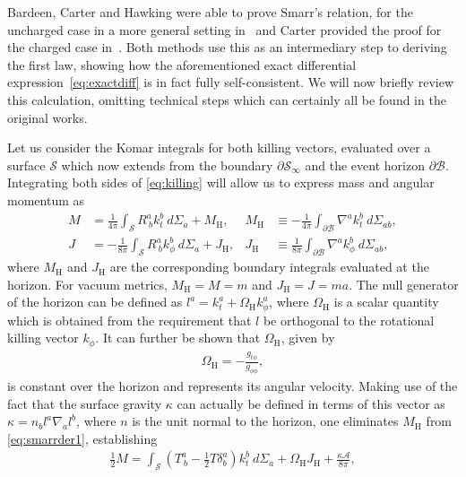 \documentclass[
twoside,
openright,
frontopenright,
]{dmathesis}
\newcommand{\nn}{\nonumber}
\begin{document}
Bardeen, Carter and Hawking were able to prove Smarr's relation, for the
uncharged case in a more general setting in~\cite{Bardeen:1973gs} and Carter
provided the proof for the charged case
in~\cite{Carter:1973rla,Carter2010}. Both methods use this as an intermediary
step to deriving the first law, showing how the aforementioned exact
differential expression~\eqref{eq:exactdiff} is in fact fully
self-consistent. We will now briefly review this calculation, omitting technical
steps which can certainly all be found in the original works.

Let us consider the Komar integrals for both killing vectors, evaluated over a
surface $\mathcal{S}$ which now extends from the boundary
$\partial \mathcal{S}_\infty$ and the event horizon $\partial
\mathcal{B}$. Integrating both sides of \cref{eq:killing} will allow us to
express mass and angular momentum as
\begin{align}
  M &= \frac{1}{4\pi}\int_\mathcal{S} R^a_{~b}k^b_t ~d\Sigma_a + M_\mathrm{H}, 
  &M_\mathrm{H} &\equiv -\frac{1}{4\pi}\int_{\partial \mathcal{B}}\nabla^a k_t^b ~ d\Sigma_{ab},\nn\\
  J &= -\frac{1}{8\pi}\int_\mathcal{S} R^a_{~b}k^b_\phi ~d\Sigma_a + J_\mathrm{H}, 
  &J_\mathrm{H} &\equiv \frac{1}{8\pi}\int_{\partial\mathcal{B}}\nabla^a k_\phi^b ~ d\Sigma_{ab},
\label{eq:smarrder1}
\end{align}
where $M_\mathrm{H}$ and $J_\mathrm{H}$ are the corresponding boundary integrals
evaluated at the horizon. For vacuum metrics, $M_\mathrm{H}=M=m$ and
$J_\mathrm{H}=J=ma$. The null generator of the horizon can be defined as
$l^a = k_t^a + \Omega_\mathrm{H} k_\phi^a$, where $\Omega_\mathrm{H}$ is a
scalar quantity which is obtained from the requirement that $l$ be orthogonal to
the rotational killing vector $k_\phi$. It can further be shown that
$\Omega_\mathrm{H}$, given by
\begin{align}
  \label{eq:angularvelocity}
  \Omega_\mathrm{H} = -\frac{g_{t\phi}}{g_{\phi\phi}},
\end{align}
is constant over the horizon and represents its angular velocity. Making use of
the fact that the surface gravity $\kappa$ can actually be defined in terms of
this vector as $\kappa = n_bl^a\nabla_al^b$, where $n$ is the unit normal to the
horizon, one eliminates $M_\mathrm{H}$ from \cref{eq:smarrder1}, establishing
\begin{align}
  \label{eq:smarrder2}
  \frac12 M = \int_\mathcal{S} \left(T^a_{~b} - \frac12 T \delta^a_b\right)k_t^b~d\Sigma_a + \Omega_\mathrm{H}
  J_\mathrm{H} + \frac{\kappa \mathcal{A}}{8\pi},
\end{align}
\end{document}
